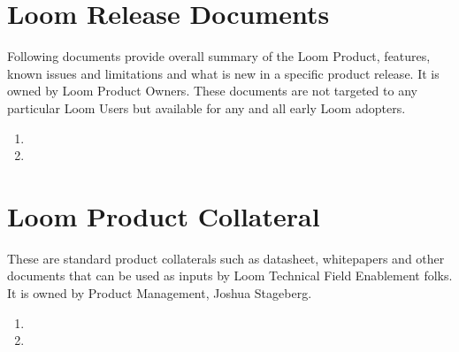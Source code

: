 \documentclass[letterpaper,10pt,english]{sphinxmanual}
\begin{document}
\section{Loom Release Documents}
\label{\detokenize{loom_topindex:loom-release-documents}}\label{\detokenize{loom_topindex:loom-rel-docs}}
Following documents provide overall summary of the Loom Product, features, known issues and limitations and what is new in a specific product release.  It is owned by Loom Product Owners. These documents are not targeted to any particular Loom Users but available for any and all early Loom adopters.
\begin{enumerate}
\item {} 

\item {} 

\end{enumerate}


\section{Loom Product Collateral}
\label{\detokenize{loom_topindex:loom-collateral}}\label{\detokenize{loom_topindex:loom-product-collateral}}
These are standard product collaterals such as datasheet, whitepapers and other documents that can be used as inputs by Loom Technical Field Enablement folks. It is owned by Product Management, Joshua Stageberg.
\begin{enumerate}
\item {} 

\item {} 

\end{enumerate}
\end{document}
